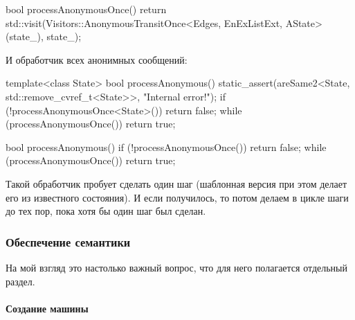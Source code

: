 \documentclass{article}
\begin{document}
{\begin{cppcode}
bool processAnonymousOnce() {
    return std::visit(Visitors::AnonymousTransitOnce<Edges, EnExListExt, AState>(state_), state_);
}
\end{cppcode}
И обработчик всех анонимных сообщений:
\begin{cppcode}
template<class State>
bool processAnonymous() {
  static_assert(areSame2<State, std::remove_cvref_t<State>>, "Internal error!");
  if (!processAnonymousOnce<State>())
    return false;
  while (processAnonymousOnce()) {
  }
  return true;
}

bool processAnonymous() {
  if (!processAnonymousOnce())
    return false;
  while (processAnonymousOnce()) {
  }
  return true;
}
\end{cppcode}
Такой обработчик пробует сделать один шаг (шаблонная версия при этом делает его из известного состояния).
И если получилось, то потом делаем в цикле шаги до тех пор, пока хотя бы один шаг был сделан.

\subsubsection{Обеспечение семантики}

На мой взгляд это настолько важный вопрос, что для него полагается отдельный раздел.

\paragraph{Создание машины}

}
\end{document}
